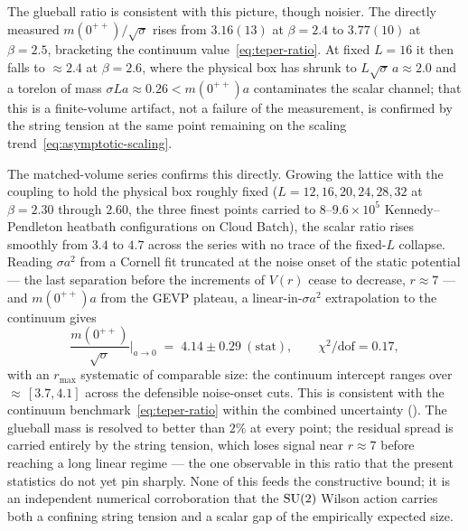 The glueball ratio is consistent with this picture, though noisier.
The directly measured $m(0^{++})/\sqrt{\sigma}$ rises from $3.16(13)$ at
$\beta = 2.4$ to $3.77(10)$ at $\beta = 2.5$, bracketing the continuum
value~\eqref{eq:teper-ratio}.  At fixed $L = 16$ it then falls to
$\approx 2.4$ at $\beta = 2.6$, where the physical box has shrunk to
$L\sqrt{\sigma}\,a \approx 2.0$ and a torelon of mass
$\sigma L a \approx 0.26 < m(0^{++})a$ contaminates the scalar channel;
that this is a finite-volume artifact, not a failure of the
measurement, is confirmed by the string tension at the same point
remaining on the scaling trend~\eqref{eq:asymptotic-scaling}.

The matched-volume series confirms this directly.  Growing the
lattice with the coupling to hold the physical box roughly fixed
($L = 12, 16, 20, 24, 28, 32$ at $\beta = 2.30$ through $2.60$, the
three finest points carried to $8$--$9.6 \times 10^{5}$
Kennedy--Pendleton heatbath configurations on Cloud Batch), the scalar
ratio rises smoothly from $3.4$ to $4.7$ across the series with no
trace of the fixed-$L$ collapse.  Reading $\sigma a^{2}$ from a
Cornell fit truncated at the noise onset of the static potential ---
the last separation before the increments of $V(r)$ cease to decrease,
$r \approx 7$ --- and $m(0^{++})a$ from the GEVP plateau, a
linear-in-$\sigma a^{2}$ extrapolation to the continuum gives
\begin{equation}
  \label{eq:matchedvol-continuum}
  \frac{m(0^{++})}{\sqrt{\sigma}}\bigg|_{a \to 0}
  \;=\; 4.14 \pm 0.29\ (\mathrm{stat}),
  \qquad \chi^{2}/\mathrm{dof} = 0.17,
\end{equation}
with an $r_{\max}$ systematic of comparable size: the continuum
intercept ranges over ${\approx}\,[3.7, 4.1]$ across the defensible
noise-onset cuts.  This is consistent with the continuum
benchmark~\eqref{eq:teper-ratio} within the combined uncertainty
().  The glueball mass is resolved to better
than $2\%$ at every point; the residual spread is carried entirely by
the string tension, which loses signal near $r \approx 7$ before
reaching a long linear regime --- the one observable in this ratio
that the present statistics do not yet pin sharply.
None of this feeds the constructive bound; it is an independent
numerical corroboration that the $\mathrm{SU}(2)$ Wilson action carries both a
confining string tension and a scalar gap of the empirically expected
size.

